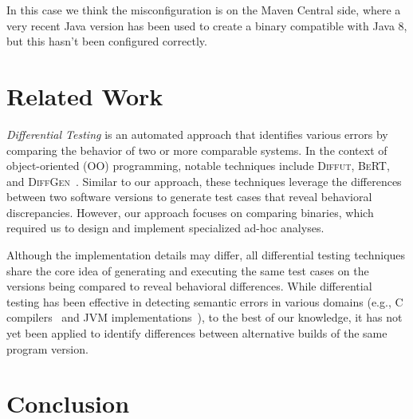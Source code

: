 \documentclass[conference]{IEEEtran}
\begin{document}
In this case we think the misconfiguration is on the Maven Central side, where a very recent Java version has been used to create a binary compatible with Java 8, but this hasn't been configured correctly.








\section{Related Work}

\emph{Differential Testing}\cite{difftesting} is an automated approach that identifies various errors by comparing the behavior of two or more comparable systems\cite{xie2007towards,jin10
,diffgen}. In the context of object-oriented (OO) programming, notable techniques include \textsc{Diffut}\cite{xie2007towards}, \textsc{BeRT}\cite{jin10
}, and \textsc{DiffGen}~\cite{diffgen}. Similar to our approach, these techniques leverage the differences between two software versions to generate test cases that reveal behavioral discrepancies. However, our approach focuses on comparing binaries, which required us to design and implement specialized ad-hoc analyses.

Although the implementation details may differ, all differential testing techniques share the core idea of generating and executing the same test cases on the versions being compared to reveal behavioral differences. %
While differential testing has been effective in detecting semantic errors in various domains (e.g., C compilers~\cite{Yang:compiler:pldi:2011} and JVM implementations~\cite{Chen:jvmdiff:pldi:2016}), to the best of our knowledge, it has not yet been applied to identify differences between alternative builds of the same program version.






\section{Conclusion}











\end{document}
